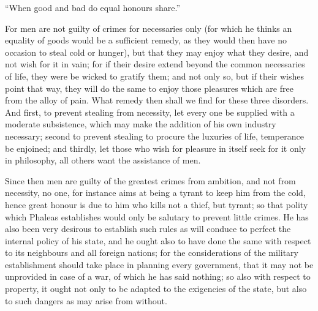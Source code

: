 ``When good and bad do equal honours share.''

For men are not guilty of crimes for necessaries only (for which he thinks
an equality of goods would be a sufficient remedy, as they would then have
no occasion to steal cold or hunger), but that they may enjoy what they
desire, and not wish for it in vain; for if their desire extend beyond the
common necessaries of life, they were be wicked to gratify them; and not
only so, but if their wishes point that way, they will do the same to
enjoy those pleasures which are free from the alloy of pain. What remedy
then shall we find for these three disorders. And first, to prevent
stealing from necessity, let every one be supplied with a moderate
subsistence, which may make the addition of his own industry necessary;
second to prevent stealing to procure the luxuries of life, temperance be
enjoined; and thirdly, let those who wish for pleasure in itself seek for
it only in philosophy, all others want the assistance of men.

Since then men are guilty of the greatest crimes from ambition, and not
from necessity, no one, for instance aims at being a tyrant to keep him
from the cold, hence great honour is due to him who kills not a thief, but
tyrant; so that polity which Phaleas establishes would only be salutary to
prevent little crimes. He has also been very desirous to establish such
rules as will conduce to perfect the internal policy of his state, and he
ought also to have done the same with respect to its neighbours and all
foreign nations; for the considerations of the military establishment
should take place in planning every government, that it may not be
unprovided in case of a war, of which he has said nothing; so also with
respect to property, it ought not only to be adapted to the exigencies of
the state, but also to such dangers as may arise from without.

